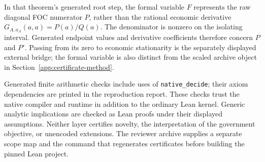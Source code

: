 In that theorem's generated root step, the formal variable $F$ represents the raw diagonal FOC numerator $P$, rather than the rational economic derivative $G_{A,a_A}(a,a)=P(a)/Q(a)$. The denominator is nonzero on the isolating interval. Generated endpoint values and derivative coefficients therefore concern $P$ and $P'$. Passing from its zero to economic stationarity is the separately displayed external bridge; the formal variable is also distinct from the scaled archive object in Section~\ref{app:certificate-method}.

Generated finite arithmetic checks include uses of \texttt{native\_decide}; their axiom dependencies are printed in the reproduction report. These checks trust the native compiler and runtime in addition to the ordinary Lean kernel. Generic analytic implications are checked as Lean proofs under their displayed assumptions. Neither layer certifies novelty, the interpretation of the government objective, or unencoded extensions. The reviewer archive supplies a separate scope map and the command that regenerates certificates before building the pinned Lean project.
